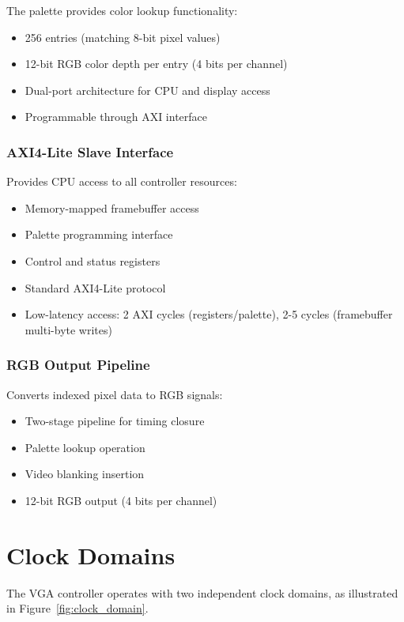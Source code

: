 \documentclass[11pt,letterpaper]{report}
\begin{document}
The palette provides color lookup functionality:

\begin{itemize}
    \item 256 entries (matching 8-bit pixel values)
    \item 12-bit RGB color depth per entry (4 bits per channel)
    \item Dual-port architecture for CPU and display access
    \item Programmable through AXI interface
\end{itemize}

\subsubsection{AXI4-Lite Slave Interface}

Provides CPU access to all controller resources:

\begin{itemize}
    \item Memory-mapped framebuffer access
    \item Palette programming interface
    \item Control and status registers
    \item Standard AXI4-Lite protocol
    \item Low-latency access: 2 AXI cycles (registers/palette), 2-5 cycles (framebuffer multi-byte writes)
\end{itemize}

\subsubsection{RGB Output Pipeline}

Converts indexed pixel data to RGB signals:

\begin{itemize}
    \item Two-stage pipeline for timing closure
    \item Palette lookup operation
    \item Video blanking insertion
    \item 12-bit RGB output (4 bits per channel)
\end{itemize}

\section{Clock Domains}

The VGA controller operates with two independent clock domains, as illustrated in Figure~\ref{fig:clock_domain}.
\end{document}
